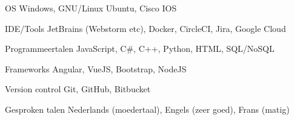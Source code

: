 
\begin{cvskills}

    \cvskill
        {OS} %
        {Windows, GNU/Linux Ubuntu, Cisco IOS} %
    
    \cvskill
        {IDE/Tools} %
        {JetBrains (Webstorm etc), Docker, CircleCI, Jira, Google Cloud} %
    
    \cvskill
        {Programmeertalen} %
        {JavaScript, C\#, C++, Python, HTML, SQL/NoSQL} %

    \cvskill
        {Frameworks} %
        {Angular, VueJS, Bootstrap, NodeJS} %
    
    \cvskill
        {Version control} %
        {Git, GitHub, Bitbucket} %
    
    \cvskill
        {Gesproken talen} %
        {Nederlands (moedertaal), Engels (zeer goed), Frans (matig)} %
    
\end{cvskills}
